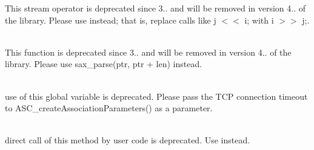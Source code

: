 \begin{DoxyRefList}
\label{deprecated__deprecated000151}%
%
This stream operator is deprecated since 3.. and will be removed in version 4.. of the library. Please use  instead; that is, replace calls like {\ttfamily j \texorpdfstring{$<$}{<}\texorpdfstring{$<$}{<} i;} with {\ttfamily i \texorpdfstring{$>$}{>}\texorpdfstring{$>$}{>} j;}.  
\item[{\parbox[t]{\linewidth}{Member \doxylink{classbasic__json_ad018e709338c810c56eaad606186a77e}{basic\+\_\+json\texorpdfstring{$<$}{<} Object\+Type, Array\+Type, String\+Type, Boolean\+Type, Number\+Integer\+Type, Number\+Unsigned\+Type, Number\+Float\+Type, Allocator\+Type, JSONSerializer, Binary\+Type, Custom\+Base\+Class \texorpdfstring{$>$}{>}::\+sax\+\_\+parse} (\doxylink{classdetail_1_1span__input__adapter}{detail::\+span\+\_\+input\+\_\+adapter} \&\&i, SAX \texorpdfstring{$\ast$}{*}sax, input\+\_\+format\+\_\+t format=input\+\_\+format\+\_\+t::\+json, const bool strict=true, const bool ignore\+\_\+comments=false)}}]\hfill \\
\label{deprecated__deprecated000150}%
%
This function is deprecated since 3.. and will be removed in version 4.. of the library. Please use sax\+\_\+parse(ptr, ptr + len) instead.  
\item[{\parbox[t]{\linewidth}{Member \doxylink{dul_8h_ad6c613c76525bd595715e2ce2216044d}{dcm\+Connection\+Timeout} }}]\hfill \\
\label{deprecated__deprecated000011}%
%
 use of this global variable is deprecated. Please pass the TCP connection timeout to ASC\+\_\+create\+Association\+Parameters() as a parameter.  
\item[{\parbox[t]{\linewidth}{Member \doxylink{class_dcm_pixel_data_a5913089564784f84289322df22350ccd}{Dcm\+Pixel\+Data::\+choose\+Representation} (const \doxylink{dcxfer_8h_a57c81ec7abc7d9ea1a391ce50c24c95d}{E\+\_\+\+Transfer\+Syntax} rep\+Type, const \doxylink{class_dcm_representation_parameter}{Dcm\+Representation\+Parameter} \texorpdfstring{$\ast$}{*}rep\+Param, \doxylink{class_dcm_stack}{Dcm\+Stack} \&stack)}}]\hfill \\
\label{deprecated__deprecated000001}%
%
 direct call of this method by user code is deprecated. Use  instead. 

\end{DoxyRefList}
